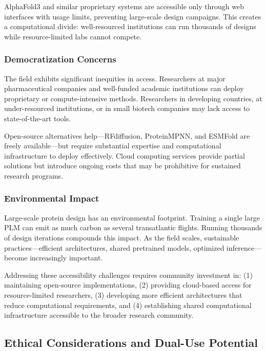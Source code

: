 AlphaFold3 and similar proprietary systems are accessible only through web interfaces with usage limits, preventing large-scale design campaigns. This creates a computational divide: well-resourced institutions can run thousands of designs while resource-limited labs cannot compete.

\subsubsection{Democratization Concerns}

The field exhibits significant inequities in access. Researchers at major pharmaceutical companies and well-funded academic institutions can deploy proprietary or compute-intensive methods. Researchers in developing countries, at under-resourced institutions, or in small biotech companies may lack access to state-of-the-art tools.

Open-source alternatives help---RFdiffusion, ProteinMPNN, and ESMFold are freely available---but require substantial expertise and computational infrastructure to deploy effectively. Cloud computing services provide partial solutions but introduce ongoing costs that may be prohibitive for sustained research programs.

\subsubsection{Environmental Impact}

Large-scale protein design has an environmental footprint. Training a single large PLM can emit as much carbon as several transatlantic flights. Running thousands of design iterations compounds this impact. As the field scales, sustainable practices---efficient architectures, shared pretrained models, optimized inference---become increasingly important.

Addressing these accessibility challenges requires community investment in: (1) maintaining open-source implementations, (2) providing cloud-based access for resource-limited researchers, (3) developing more efficient architectures that reduce computational requirements, and (4) establishing shared computational infrastructure accessible to the broader research community.

\subsection{Ethical Considerations and Dual-Use Potential}
\label{subsec:ethics}

